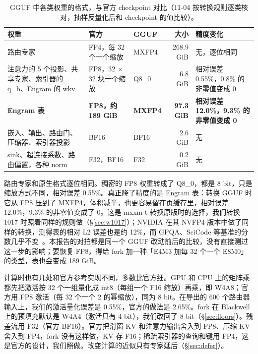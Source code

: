 \documentclass[11pt,a4paper]{article}
\begin{document}
\begin{table}[h]
  \centering
  \small
  \caption{GGUF 中各类权重的格式，与官方 checkpoint 对比（11-04 按转换规则逐类核对，抽样反量化后和 checkpoint 的值比较）。}
  \label{tab:formats}
  \begin{tabularx}{\textwidth}{@{}>{\raggedright\arraybackslash}p{4.3cm} >{\raggedright\arraybackslash}p{2.8cm} l r >{\raggedright\arraybackslash}X@{}}
    \toprule
    权重 & 官方 & GGUF & 大小 & 精度变化 \\
    \midrule
    路由专家 & FP4，每 32 个一个缩放 & MXFP4 & 268.9 GiB & 无，逐位相同 \\
    注意力的 5 个投影、共享专家、索引器的 q\_b、Engram 的 wkv & FP8，32 × 32 块一个缩放 & Q8\_0 & 6.8 GiB & 相对误差 0.55\%，0.8\% 的非零值变成 0 \\
    \textbf{Engram 表} & \textbf{FP8，约 189 GiB} & \textbf{MXFP4} & \textbf{97.3 GiB} & \textbf{相对误差 12.0\%，9.3\% 的非零值变成 0} \\
    嵌入、输出、路由门、压缩器、索引器投影 & BF16 & BF16 & 2.6 GiB & 无 \\
    sink、超连接系数、路由偏置，各种 norm & F32，BF16 & F32 & 0.2 GiB & 无 \\
    \bottomrule
  \end{tabularx}
\end{table}

路由专家和原生格式逐位相同。稠密的 FP8 权重转成了 Q8\_0，都是 8 bit，只是缩放方式不同，相对误差 0.55\%。真正降了精度的是 Engram 表：转换 GGUF 时它从 FP8 压到了 MXFP4，体积减半，也更容易留在页缓存里，相对误差 12.0\%，9.3\% 的非零值变成了 0。这是 mxxm-t 转换原版时的选择，我们转换 1017 时照着同样的规则做（\S\ref{sec:w1017}）；NVIDIA 在其 NVFP4 版本中做了同样的转换，测得表的相对 L2 误差也是约 12\%，而 GPQA、SciCode 等基准的分数几乎不变~\cite{nvfp4}。本报告的对拍都是同一个 GGUF 改动前后的比较，没有直接测过这一步的影响；要恢复 FP8，得给 fork 加一种「E4M3 加每 32 个一个 E8M0」的类型，表也会变成 189 GiB。

计算时也有几处和官方参考实现不同，多数比官方细。GPU 和 CPU 上的矩阵乘都先把激活按 32 个一组量化成 int8（每组一个 F16 缩放）再乘，即 W4A8；官方用 FP8 激活（每 32 个一个 2 的幂缩放），同为 8 bit。在导出的 600 个路由器输入上，我们的激活量化误差是 0.55\%，官方的做法是 2.65\%。fork 在 Blackwell 上的预填充默认是 W4A4（激活只有 4 bit），我们改回了 8 bit（\S\ref{sec:floors}）。残差流用 F32（官方 BF16）。官方把滑窗 KV 和注意力输出舍入到 FP8、压缩 KV 舍入到 FP4，fork 没有这样做，KV 存 F16；稀疏索引器的查询和键用 FP4，这是官方的设计，我们照做。改变计算的近似只有专家延后（\S\ref{sec:defer}）。
\end{document}
